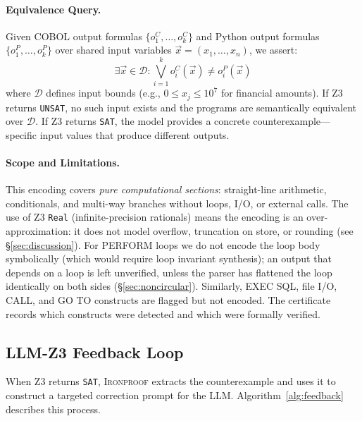 \documentclass[sigconf,nonacm]{acmart}
\begin{document}
\paragraph{Equivalence Query.} Given COBOL output formulas $\{o^C_1, \ldots, o^C_k\}$ and Python output formulas $\{o^P_1, \ldots, o^P_k\}$ over shared input variables $\vec{x} = (x_1, \ldots, x_n)$, we assert:
\begin{equation}\label{eq:equiv}
\exists \vec{x} \in \mathcal{D} : \bigvee_{i=1}^{k} o^C_i(\vec{x}) \neq o^P_i(\vec{x})
\end{equation}
where $\mathcal{D}$ defines input bounds (e.g., $0 \leq x_j \leq 10^7$ for financial amounts). If Z3 returns \texttt{UNSAT}, no such input exists and the programs are semantically equivalent over $\mathcal{D}$. If Z3 returns \texttt{SAT}, the model provides a concrete counterexample---specific input values that produce different outputs.

\paragraph{Scope and Limitations.} This encoding covers \emph{pure computational sections}: straight-line arithmetic, conditionals, and multi-way branches without loops, I/O, or external calls. The use of Z3 \texttt{Real} (infinite-precision rationals) means the encoding is an over-approximation: it does not model overflow, truncation on store, or rounding (see \S\ref{sec:discussion}). For PERFORM loops we do not encode the loop body symbolically (which would require loop invariant synthesis); an output that depends on a loop is left unverified, unless the parser has flattened the loop identically on both sides (\S\ref{sec:noncircular}). Similarly, EXEC SQL, file I/O, CALL, and GO TO constructs are flagged but not encoded. The certificate records which constructs were detected and which were formally verified.

\subsection{LLM-Z3 Feedback Loop}\label{sec:feedback}

When Z3 returns \texttt{SAT}, \textsc{Ironproof} extracts the counterexample and uses it to construct a targeted correction prompt for the LLM. Algorithm~\ref{alg:feedback} describes this process.
\end{document}
